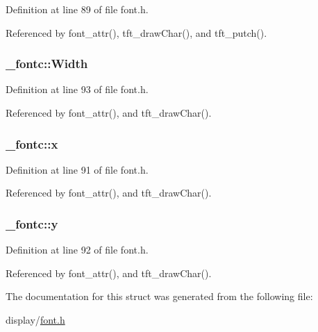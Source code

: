 Definition at line 89 of file font.\-h.



Referenced by font\-\_\-attr(), tft\-\_\-draw\-Char(), and tft\-\_\-putch().

\hypertarget{struct__fontc_ae3c802e1c35ae9a4e37c8eb2e9644325}{
\subsubsection[{Width}]{ \-\_\-fontc\-::\-Width}}\label{struct__fontc_ae3c802e1c35ae9a4e37c8eb2e9644325}


Definition at line 93 of file font.\-h.



Referenced by font\-\_\-attr(), and tft\-\_\-draw\-Char().

\hypertarget{struct__fontc_ad15d00ed46ebe52a085cf05b5ca5da90}{
\subsubsection[{x}]{ \-\_\-fontc\-::x}}\label{struct__fontc_ad15d00ed46ebe52a085cf05b5ca5da90}


Definition at line 91 of file font.\-h.



Referenced by font\-\_\-attr(), and tft\-\_\-draw\-Char().

\hypertarget{struct__fontc_aebbde0dc41068722ee1a69f4a56478a4}{
\subsubsection[{y}]{ \-\_\-fontc\-::y}}\label{struct__fontc_aebbde0dc41068722ee1a69f4a56478a4}


Definition at line 92 of file font.\-h.



Referenced by font\-\_\-attr(), and tft\-\_\-draw\-Char().



The documentation for this struct was generated from the following file\-:\begin{DoxyCompactItemize}
\item 
display/\hyperlink{display_2font_8h}{font.\-h}\end{DoxyCompactItemize}
